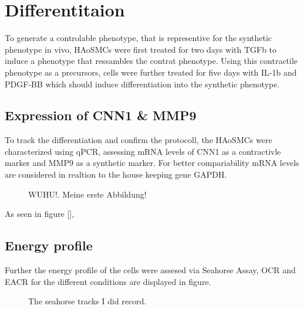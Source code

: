 \section{Differentitaion}
\label{sec:differentiation}
To generate a controlable phenotype, that is representive for the synthetic phenotype in vivo, HAoSMCs were first treated for two days with TGFb to induce a phenotype that ressambles the contrat phenotype. Using this contractile phenotype as a precursors, cells were further treated for five days with IL-1b and PDGF-BB which should induce differentiation into the synthetic phenotype.

    \subsection{Expression of CNN1 \& MMP9}
    To track the differentiation and confirm the protocoll, the HAoSMCs were characterized using qPCR, assessing mRNA levels of CNN1 as a contractivle marker and MMP9 as a synthetic marker. For better compariability mRNA levels are considered in realtion to the house keeping gene GAPDH.

    \label{subsec:qPCR}
    \begin{figure}[h]
    \capstart
        \centering
    	

    	\begin{minipage}{\captionwidth}
    		\caption[CNN_qPCR]{ \newline WUHU!. Meine erste Abbildung!}
    		\label{fig:qPCR}
    	\end{minipage}
    \end{figure}

    As seen in figure [],


    \subsection{Energy profile}
    Further the energy profile of the cells were assesed via Seahorse Assay, OCR and EACR for the different conditions are displayed in figure.

    \label{subsec:energy}
    \begin{figure}[h]
    \capstart
        \centering
    	

    	\begin{minipage}{\captionwidth}
    		\caption[seahorse_tracks]{ \newline The seahorse tracks I did record.}
    		\label{fig:energy_profile}
    	\end{minipage}
    \end{figure}

